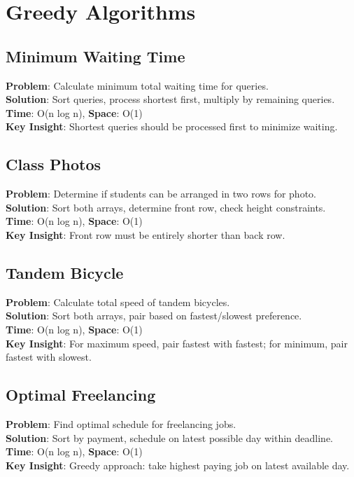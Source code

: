 \documentclass{report}
\begin{document}
\section{Greedy Algorithms}

\subsection{Minimum Waiting Time}
\textbf{Problem}: Calculate minimum total waiting time for queries.\\
\textbf{Solution}: Sort queries, process shortest first, multiply by remaining queries.\\
\textbf{Time}: O(n log n), \textbf{Space}: O(1)\\
\textbf{Key Insight}: Shortest queries should be processed first to minimize waiting.

\subsection{Class Photos}
\textbf{Problem}: Determine if students can be arranged in two rows for photo.\\
\textbf{Solution}: Sort both arrays, determine front row, check height constraints.\\
\textbf{Time}: O(n log n), \textbf{Space}: O(1)\\
\textbf{Key Insight}: Front row must be entirely shorter than back row.

\subsection{Tandem Bicycle}
\textbf{Problem}: Calculate total speed of tandem bicycles.\\
\textbf{Solution}: Sort both arrays, pair based on fastest/slowest preference.\\
\textbf{Time}: O(n log n), \textbf{Space}: O(1)\\
\textbf{Key Insight}: For maximum speed, pair fastest with fastest; for minimum, pair fastest with slowest.

\subsection{Optimal Freelancing}
\textbf{Problem}: Find optimal schedule for freelancing jobs.\\
\textbf{Solution}: Sort by payment, schedule on latest possible day within deadline.\\
\textbf{Time}: O(n log n), \textbf{Space}: O(1)\\
\textbf{Key Insight}: Greedy approach: take highest paying job on latest available day.
\end{document}
